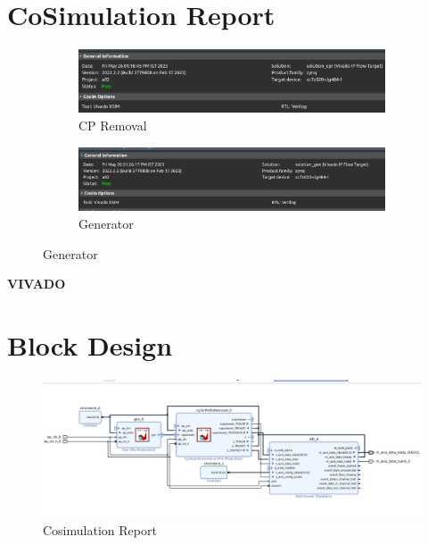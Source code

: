 \documentclass{article}
\begin{document}
\vspace{15cm}


\section{CoSimulation Report}
\vspace{1cm}
\begin{figure}[h]
\centering
\begin{subfigure}[b]{1.2\textwidth}
    \centering
\includegraphics[width=\textwidth]{figs/cpr3.png}
    \caption{CP Removal}
    \label{fig:my_label}
\end{subfigure}
\hfill
\begin{subfigure}[b]{1.2\textwidth}
    \centering
\includegraphics[width=\textwidth]{figs/gen3.png}
    \caption{Generator}
    \label{fig:my_label}
\end{subfigure}
\end{figure}
\vspace{15cm}


\maketitle
\hfill \textbf{VIVADO}
\section{Block Design}
\vspace{1cm}
\begin{figure}[h]
    \centering
\includegraphics[width=\columnwidth]{figs/bd.png}
    \caption{Cosimulation Report}
    \label{fig:my_label}
\end{figure}
\vspace{3cm}
\end{document}
